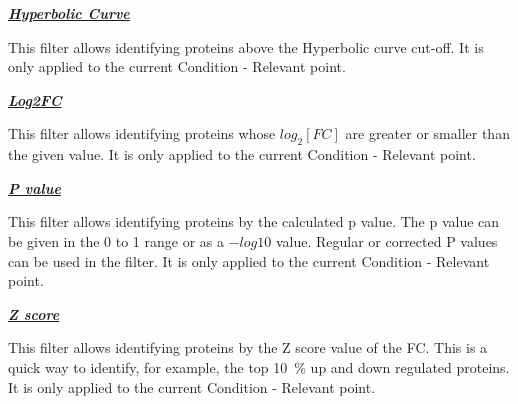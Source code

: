 \textbf{\textit{\underline{Hyperbolic Curve}}}

This filter allows identifying proteins above the Hyperbolic curve cut-off. It is
only applied to the current Condition - Relevant point.

\textbf{\textit{\underline{Log2FC}}}

This filter allows identifying proteins whose $log_2[FC]$ are greater or smaller
than the given value. It is only applied to the current Condition - Relevant point.

\textbf{\textit{\underline{P value}}}

This filter allows identifying proteins by the calculated p value. The p value
can be given in the 0 to 1 range or as a $-log10$ value. Regular or corrected P
values can be used in the filter. It is only applied to the current Condition -
Relevant point.

\textbf{\textit{\underline{Z score}}}

This filter allows identifying proteins by the Z score value of the FC. This is a
quick way to identify, for example, the top \SI{10}{\percent} up and down regulated
proteins. It is only applied to the current Condition - Relevant point.


































